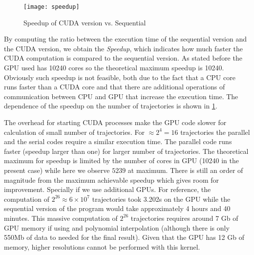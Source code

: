 \begin{figure}[H]
    \centering
    \texttt{[image: speedup]}
    \caption{Speedup of CUDA version vs. Sequential}%
    \label{fig:speedup}
\end{figure}


By computing the ratio between the execution time of the sequential version and the CUDA
version, we obtain the \emph{Speedup}, which indicates how much faster the CUDA computation is
compared to the sequential version. As stated before the GPU used has 10240 cores so the
theoretical maximum speedup is 10240. Obviously such speedup is not feasible, both due to the
fact that a CPU core runs faster than a CUDA core and that there are additional operations
of communication between CPU and GPU that increase the execution time.
The dependence of the speedup on the number of trajectories is shown in \cref{fig:speedup}.

The overhead for starting CUDA processes make the GPU code slower for
calculation of small number of trajectories. For $\approx 2^4 = 16$ trajectories
the parallel and the serial codes require a similar execution time. The parallel
code runs faster (speedup larger than one) for larger number of trajectories.
The theoretical maximum for speedup is limited by the number of cores in GPU
(10240 in the present case) while here we observe $5239$ at maximum. There is
still an order of magnitude from the maximum achievable speedup which gives room
for improvement. Specially if we use additional GPUs. For reference, the
computation of $2^{26} \approx 6\times 10^7$ trajectories took 3.202s on the GPU
while the sequential version of the program would take approximately 4 hours and
40 minutes.  This massive computation of $2^{26}$ trajectories requires around 7
Gb of GPU memory if using and polynomial interpolation (although there is only
550Mb of data to needed for the final result). Given that the GPU has 12 Gb of
memory, higher resolutions cannot be performed with this kernel.

